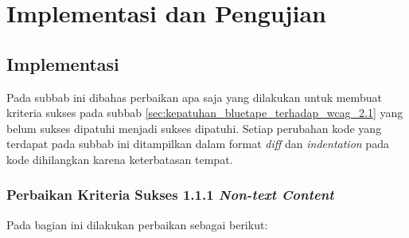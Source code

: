 \chapter{Implementasi dan Pengujian}
\label{chap:implementasi_dan_pengujian}

\section{Implementasi}
\label{sec:implementasi}
Pada subbab ini dibahas perbaikan apa saja yang dilakukan untuk membuat kriteria sukses pada subbab \ref{sec:kepatuhan_bluetape_terhadap_wcag_2.1}
yang belum sukses dipatuhi menjadi sukses dipatuhi. Setiap perubahan kode yang terdapat pada subbab ini ditampilkan dalam format \textit{diff} dan \textit{indentation} pada kode dihilangkan karena keterbatasan tempat. 

\subsection{Perbaikan Kriteria Sukses 1.1.1 \textit{Non-text Content}}
\label{subsec:perbaikan_kriteria_sukses_1.1.1}
Pada bagian ini dilakukan perbaikan sebagai berikut:

